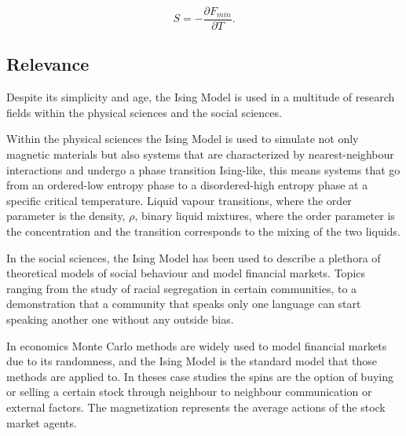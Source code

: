 \begin{equation}
	S = - \frac{\partial F_{min}}{\partial T}.
\end{equation}

\subsection{Relevance}

Despite its simplicity and age, the Ising Model is used in a multitude of research fields within the physical sciences and the social sciences. 

Within the physical sciences the Ising Model is used to simulate not only magnetic materials but also systems that are characterized by nearest-neighbour interactions and undergo a phase transition Ising-like, this means systems that go from an ordered-low entropy phase to a disordered-high entropy phase at a specific critical temperature\cite{Pelissetto2002}. 
Liquid vapour transitions, where the order parameter is the density, $\rho$, binary liquid mixtures, where the order parameter is the concentration and the transition corresponds to the mixing of the two liquids.

In the social sciences, the Ising Model has been used to describe a plethora of theoretical models of social behaviour and model financial markets\cite{review_social_ising}. 
Topics ranging from the study of racial segregation in certain communities\cite{segregation}, to a demonstration that a community that speaks only one language can start speaking another one without any outside bias\cite{language_ising}.

In economics Monte Carlo methods are widely used to model financial markets due to its randomness, and the Ising Model is the standard model that those methods are applied to. In theses case studies the spins are the option of buying or selling a certain stock through neighbour to neighbour communication or external factors. The magnetization represents the average actions of the stock market agents\cite{stock_ising, eco_thesis}.












